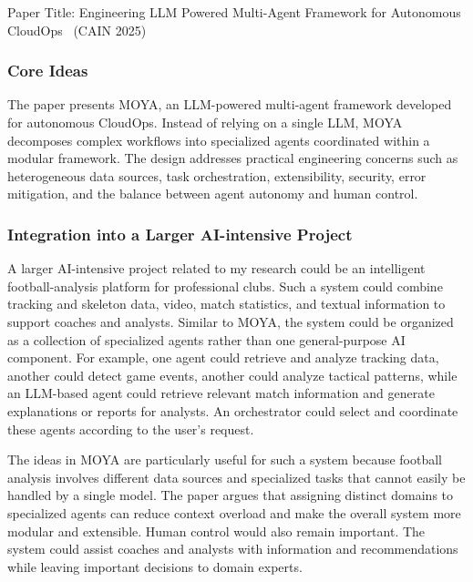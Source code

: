     Paper Title: Engineering LLM Powered Multi-Agent Framework for Autonomous CloudOps~\cite{ParthasarathyEtAl2025CloudOps} (CAIN 2025)
    
    \subsubsection{Core Ideas}

    The paper presents MOYA, an LLM-powered multi-agent framework developed for autonomous CloudOps. Instead of relying on a single LLM, MOYA decomposes complex workflows into specialized agents coordinated within a modular framework. The design addresses practical engineering concerns such as heterogeneous data sources, task orchestration, extensibility, security, error mitigation, and the balance between agent autonomy and human control. 

    \subsubsection{Integration into a Larger AI-intensive Project}
    
    A larger AI-intensive project related to my research could be an intelligent football-analysis platform for professional clubs. Such a system could combine tracking and skeleton data, video, match statistics, and textual information to support coaches and analysts. Similar to MOYA, the system could be organized as a collection of specialized agents rather than one general-purpose AI component. For example, one agent could retrieve and analyze tracking data, another could detect game events, another could analyze tactical patterns, while an LLM-based agent could retrieve relevant match information and generate explanations or reports for analysts. An orchestrator could select and coordinate these agents according to the user's request.
    
    The ideas in MOYA are particularly useful for such a system because football analysis involves different data sources and specialized tasks that cannot easily be handled by a single model. The paper argues that assigning distinct domains to specialized agents can reduce context overload and make the overall system more modular and extensible. 
    Human control would also remain important. The system could assist coaches and analysts with information and recommendations while leaving important decisions to domain experts. 
    
